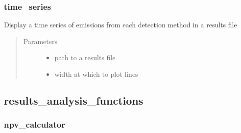 \documentclass[letterpaper,10pt,english]{sphinxmanual}
\begin{document}
\subsubsection{time\_series}
\label{\detokenize{index:time-series}}

\begin{fulllineitems}
\label{\detokenize{index:feast.ResultsProcessing.plotting_functions.time_series}}
Display a time series of emissions from each detection method in a results file
\begin{quote}\begin{description}
\item[{Parameters}] \leavevmode\begin{itemize}
\item {} 
 \textendash{} path to a results file

\item {} 
 \textendash{} width at which to plot lines

\end{itemize}

\end{description}\end{quote}

\end{fulllineitems}



\subsection{results\_analysis\_functions}
\label{\detokenize{index:module-feast.ResultsProcessing.results_analysis_functions}}\label{\detokenize{index:results-analysis-functions}}

\subsubsection{npv\_calculator}
\label{\detokenize{index:npv-calculator}}
\end{document}

